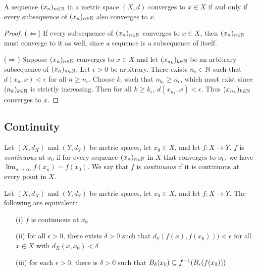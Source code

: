 \documentclass{article}
\begin{document}
\begin{proposition}
A sequence $(x_n)_{n \in {\mathbb{N}}}$ in a metric space $(X,d)$ converges to $x \in X$ if and only if every subsequence of $(x_n)_{n \in {\mathbb{N}}}$  also converges to $x$.
\end{proposition}
\begin{proof}
($\Leftarrow$) If every subsequence of $(x_n)_{n \in {\mathbb{N}}}$ converges to $x \in X$, then  $(x_n)_{n \in {\mathbb{N}}}$ must converge to it as well, since a sequence is a subsequence of itself. 

($\Rightarrow$) Suppose $(x_n)_{n \in {\mathbb{N}}}$ converges to $x \in X$ and let $(x_{n_k})_{k \in {\mathbb{N}}}$ be an arbitrary subsequence of $(x_n)_{n \in {\mathbb{N}}}$. Let $\epsilon > 0$ be arbitrary. There exists $n_\epsilon \in {\mathbb{N}}$ such that $d(x_n,x) < \epsilon$ for all $n \geq n_\epsilon$. Choose $k_\epsilon$ such that $n_{k_\epsilon} \geq n_\epsilon$, which must exist since $(n_k)_{k\in{\mathbb{N}}}$ is strictly increasing. Then for all $k \geq k_\epsilon$, $d(x_{n_k},x) < \epsilon$. Thus $(x_{n_k})_{k \in {\mathbb{N}}}$ converges to $x$.
\end{proof}


\subsection{Continuity}

\begin{definition}
Let $(X,d_X)$ and $(Y,d_Y)$ be metric spaces, let $x_0 \in X$, and let $f:X\to Y$. $f$ is \emph{continuous} at $x_0$ if for every sequence $(x_n)_{n\in{\mathbb{N}}}$ in $X$ that converges to $x_0$, we have $\lim_{n\to\infty}f(x_n)=f(x_0)$.
We say that $f$ is \emph{continuous} if it is continuous at every point in $X$.
\end{definition}

\begin{theorem}
\label{thm:cont_equiv}
Let $(X,d_X)$ and $(Y,d_Y)$ be metric spaces, let $x_0 \in X$, and let $f:X\to Y$. The following are equivalent:
\begin{enumerate}
    \item[(i)] $f$ is continuous at $x_0$
    \item[(ii)] for all $\epsilon>0$, there exists $\delta > 0$ such that $d_Y(f(x),f(x_0))) < \epsilon$ for all $x \in X$ with $d_X(x,x_0) < \delta$
    \item[(iii)] for each $\epsilon>0$, there is $\delta > 0$ such that $B_\delta(x_0) \subseteq f^{-1} (B_\epsilon(f(x_0)))$
\end{enumerate}
\end{theorem}
\end{document}
